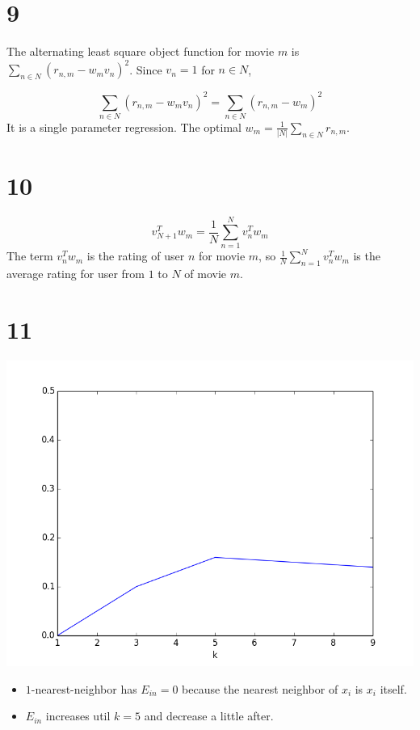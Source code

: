 \documentclass[12pt]{article}
\begin{document}
\section*{9}
The alternating least square object function for movie $m$ is 
$\sum_{n\in N} (r_{n,m} - w_m v_n)^2$. Since $v_n = 1$ for $n\in N$,  

$$
\sum_{n\in N} (r_{n,m} - w_m v_n)^2 = \sum_{n\in N} (r_{n,m} - w_m)^2
$$
It is a single parameter regression. 
The optimal $w_m = \frac{1}{|N|} \sum_{n\in N} r_{n,m}$.

\section*{10}
\[
    v_{N+1}^T w_m = \frac{1}{N} \sum_{n=1}^{N} v_n^T w_m    
\]
The term $v_n^T w_m$ is the rating of user $n$ for movie $m$, 
so $\frac{1}{N} \sum_{n=1}^{N} v_n^T w_m$ is the average rating for user from $1$ to $N$ of movie $m$.

\section*{11}
\begin{center}
    \includegraphics[scale=0.5]{p11.png}
\end{center}
\begin{itemize}
    \item $1$-nearest-neighbor has $E_{in}=0$ because the nearest neighbor of $x_i$ is $x_i$ itself.
    \item $E_{in}$ increases util $k=5$ and decrease a little after.
\end{itemize}
\end{document}
